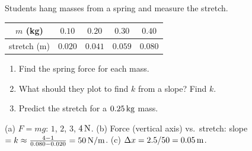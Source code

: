 \begin{exo}{}
Students hang masses from a spring and measure the stretch.
\begin{center}\begin{tabular}{c|cccc}
$m$ (kg) & $0.10$ & $0.20$ & $0.30$ & $0.40$\\\hline
stretch (m) & $0.020$ & $0.041$ & $0.059$ & $0.080$
\end{tabular}\end{center}
\begin{enumerate}[label=(\alph*)]
\item Find the spring force for each mass.
\item What should they plot to find $k$ from a slope? Find $k$.
\item Predict the stretch for a $0.25\,\mathrm{kg}$ mass.
\end{enumerate}
\work{5cm}
\begin{solution}
(a) $F=mg$: $1$, $2$, $3$, $4\,\mathrm{N}$. \;(b) Force (vertical axis) vs.\ stretch: slope $=k\approx\frac{4-1}{0.080-0.020}=50\,\mathrm{N/m}$. \;(c) $\Delta x=2.5/50=0.05\,\mathrm{m}$.
\end{solution}
\end{exo}

